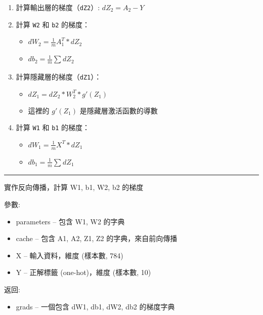 \documentclass[11pt]{article}
\providecommand{\tightlist}{%
      \setlength{\itemsep}{0pt}\setlength{\parskip}{0pt}}
\begin{document}
\begin{enumerate}
\def\labelenumi{\arabic{enumi}.}
\tightlist
\item
  計算輸出層的梯度（\texttt{dZ2}）: \(dZ_2=A_2-Y\)
\item
  計算 \texttt{W2} 和 \texttt{b2} 的梯度：

  \begin{itemize}
  \tightlist
  \item
    \(dW_2=\frac{1}{m}A^T_1*dZ_2\)
  \item
    \(db_2=\frac{1}{m}\sum_{}^{}{dZ_2}\)
  \end{itemize}
\item
  計算隱藏層的梯度（\texttt{dZ1}）：

  \begin{itemize}
  \tightlist
  \item
    \(dZ_1=dZ_2*W_2^T*g'(Z_1)\)
  \item
    這裡的 \(g'(Z_1)\) 是隱藏層激活函數的導數
  \end{itemize}
\item
  計算 \texttt{W1} 和 \texttt{b1} 的梯度：

  \begin{itemize}
  \tightlist
  \item
    \(dW_1=\frac{1}{m}X^T*dZ_1\)
  \item
    \(db_1=\frac{1}{m}\sum_{}^{}{dZ_1}\)
  \end{itemize}
\end{enumerate}

\begin{center}\rule{0.5\linewidth}{0.5pt}\end{center}

實作反向傳播，計算 W1, b1, W2, b2 的梯度

參數:

\begin{itemize}
\tightlist
\item
  parameters -- 包含 W1, W2 的字典
\item
  cache -- 包含 A1, A2, Z1, Z2 的字典，來自前向傳播
\item
  X -- 輸入資料，維度 (樣本數, 784)
\item
  Y -- 正解標籤 (one-hot)，維度 (樣本數, 10)
\end{itemize}

返回:

\begin{itemize}
\tightlist
\item
  grads -- 一個包含 dW1, db1, dW2, db2 的梯度字典
\end{itemize}
\end{document}
